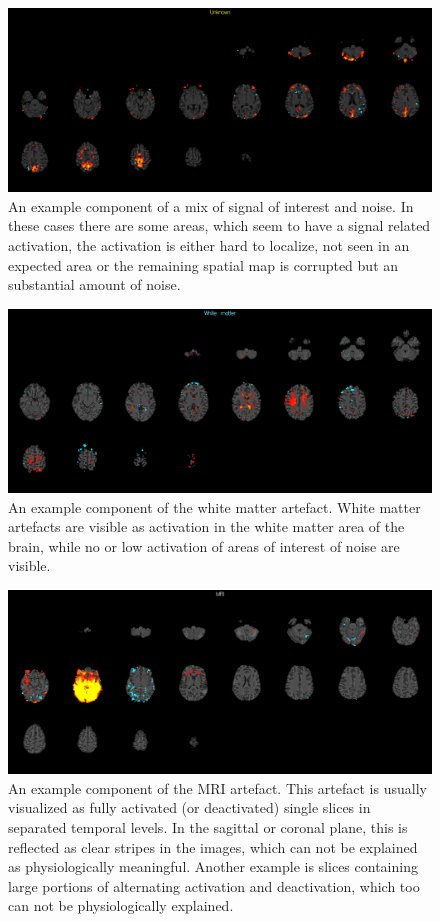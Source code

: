 \begin{figure}[H]                 
	\includegraphics[width=.85\textwidth]{figures/bMethods/unknown}  
	\caption{An example component of a mix of signal of interest and noise. In these cases there are some areas, which seem to have a signal related activation, the activation is either hard to localize, not seen in an expected area or the remaining spatial map is corrupted but an substantial amount of noise.}
	\label{fig:meth:unknown} 
\end{figure}


\begin{figure}[H]                 
	\includegraphics[width=.85\textwidth]{figures/bMethods/white_matter}  
	\caption{An example component of the white matter artefact. White matter artefacts are visible as activation in the white matter area of the brain, while no or low activation of areas of interest of noise are visible.}
	\label{fig:meth:walter_white} 
\end{figure}



\begin{figure}[H]                 
	\includegraphics[width=.85\textwidth]{figures/bMethods/MRI}  
	\caption{An example component of the MRI artefact. This artefact is usually visualized as fully activated (or deactivated) single slices in separated temporal levels. In the sagittal or coronal plane, this is reflected as clear stripes in the images, which can not be explained as physiologically meaningful. Another example is slices containing large portions of alternating activation and deactivation, which too can not be physiologically explained.}
	\label{fig:meth:MRI} 
\end{figure}
%



